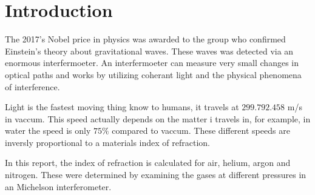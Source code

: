 \section{Introduction}


The 2017's Nobel price in physics was awarded to the group who confirmed Einstein's theory about gravitational waves. These waves was detected via an enormous interfermoeter. An interfermoeter can measure very small changes in optical paths and works by utilizing coherant light and the physical phenomena of interference. 

Light is the fastest moving thing know to humans, it travels at $299.792.458$ m/s in vaccum. This speed actually depends on the matter i travels in, for example, in water the speed is only $75\%$ compared to vaccum. These different speeds are inversly proportional to a materials index of refraction. 

In this report, the index of refraction is calculated for air, helium, argon and nitrogen. These were determined by examining the gases at different pressures in an Michelson interferometer.

